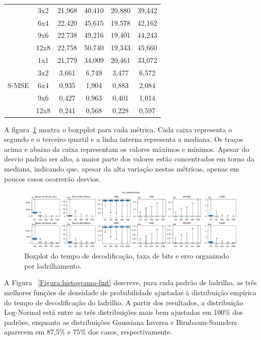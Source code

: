 \begin{longtable}{|c|c|c|c|c|c|}
        & 3x2  & 21,968    & 40,410     & 20,880    & 39,442   \\  \cline{2-6}
        & 6x4  & 22,420    & 45,615     & 19,578    & 42,162   \\  \cline{2-6}           
        & 9x6  & 22,738    & 49,216     & 19,401    & 44,243   \\  \cline{2-6}                
        & 12x8 & 22,758    & 50,740     & 19,343    & 45,660   \\  \hline 
        \multirow{5}{*}{S-MSE}  & 1x1  & 21,779    & 34,009     & 20,461    & 33,072   \\  \cline{2-6}
        & 3x2  & 3,661     & 6,749      & 3,477     & 6,572    \\  \cline{2-6}
        & 6x4  & 0,935     & 1,904      & 0,883     & 2,084    \\  \cline{2-6}
        & 9x6  & 0,427     & 0,963      & 0,401     & 1,014    \\  \cline{2-6}
        & 12x8 & 0,241     & 0,568      & 0,228     & 0,597 
\end{longtable}

A figura~\ref{Fig:boxplottiling} mostra o boxpplot para cada métrica. Cada caixa representa o segundo e o terceiro quartil e a linha interna representa a mediana. Os traços acima e abaixo da caixa representam os valores máximos e mínimos. Apesar do desvio padrão ser alto, a maior parte dos valores estão concentrados em torno da mediana, indicando que, apesar da alta variação nestas métricas, apenas em poucos casos ocorrerão desvios.

\begin{figure}[htb]
         \centering         

           \includegraphics[width=0.9\columnwidth]{fig/ByPattern/boxplot_pattern.pdf}
           \caption{Boxplot do tempo de decodificação, taxa de bits e erro organizado por ladrilhamento.}
           \label{Fig:boxplottiling}
\end{figure}


A Figura ~\ref{Figura:histograma-fmt} descreve, para cada padrão de ladrilho, as três melhores funções de densidade de probabilidade ajustadas à distribuição empírica do tempo de decodificação do ladrilho. A partir dos resultados, a distribuição Log-Normal está entre as três distribuições mais bem ajustadas em 100\% dos padrões, enquanto as distribuições Gaussiana Inversa e Birnbaum-Saunders aparecem em 87,5\% e 75\% dos casos, respectivamente.


